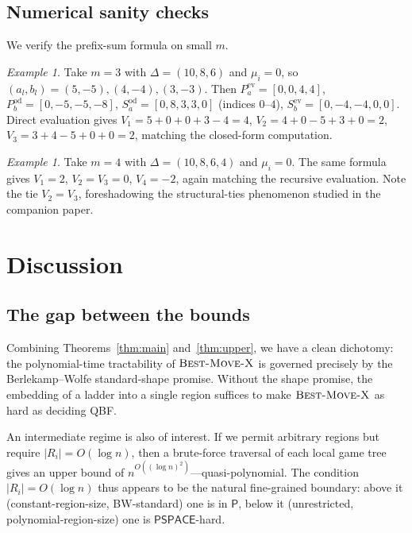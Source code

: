 \documentclass[11pt,a4paper]{amsart}
\theoremstyle{definition}
\theoremstyle{remark}
\newtheorem{example}[theorem]{Example}
\newcommand{\PSPACE}{\mathsf{PSPACE}}
\newcommand{\BMX}{\textsc{Best-Move-X}}
\begin{document}
\subsection{Numerical sanity checks}

We verify the prefix-sum formula on small $m$.

\begin{example}\label{ex:m3}
Take $m = 3$ with $\Delta = (10, 8, 6)$ and $\mu_i = 0$, so
$(a_l, b_l) = (5, -5), (4, -4), (3, -3)$. Then
$P_a^{\mathrm{ev}} = [0,0,4,4]$, $P_b^{\mathrm{od}} = [0,-5,-5,-8]$,
$S_a^{\mathrm{od}} = [0,8,3,3,0]$ (indices $0$--$4$),
$S_b^{\mathrm{ev}} = [0,-4,-4,0,0]$. Direct evaluation gives
$V_1 = 5 + 0 + 0 + 3 - 4 = 4$, $V_2 = 4 + 0 - 5 + 3 + 0 = 2$,
$V_3 = 3 + 4 - 5 + 0 + 0 = 2$, matching the closed-form computation.
\end{example}

\begin{example}\label{ex:m4}
Take $m = 4$ with $\Delta = (10, 8, 6, 4)$ and $\mu_i = 0$. The same
formula gives $V_1 = 2$, $V_2 = V_3 = 0$, $V_4 = -2$, again matching the
recursive evaluation. Note the tie $V_2 = V_3$, foreshadowing the
structural-ties phenomenon studied in the companion paper.
\end{example}

\section{Discussion}\label{sec:discussion}

\subsection{The gap between the bounds}

Combining Theorems~\ref{thm:main} and~\ref{thm:upper}, we have a clean
dichotomy: the polynomial-time tractability of $\BMX$ is governed
precisely by the Berlekamp--Wolfe standard-shape promise. Without the
shape promise, the embedding of a ladder into a single region suffices to
make $\BMX$ as hard as deciding QBF.

An intermediate regime is also of interest. If we permit arbitrary
regions but require $|R_i| = O(\log n)$, then a brute-force traversal of
each local game tree gives an upper bound of
$n^{O((\log n)^2)}$---quasi-polynomial. The condition $|R_i| = O(\log n)$
thus appears to be the natural fine-grained boundary: above it
(constant-region-size, BW-standard) one is in $\mathsf{P}$, below it
(unrestricted, polynomial-region-size) one is $\PSPACE$-hard.
\end{document}
